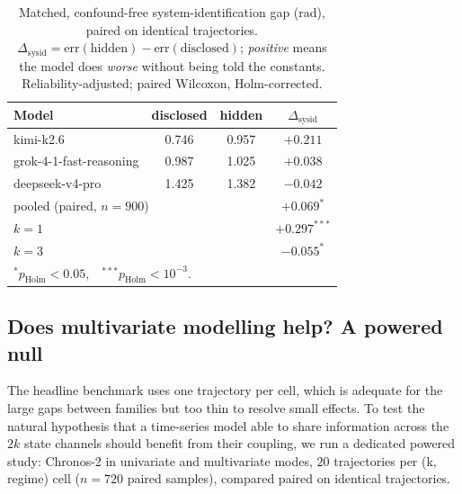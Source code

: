 \documentclass{article}
\begin{document}
\begin{table}[t]
\centering\small
\caption{Matched, confound-free system-identification gap (rad), paired on identical
trajectories. $\Delta_{\mathrm{sysid}}=\mathrm{err}(\text{hidden})-
\mathrm{err}(\text{disclosed})$; \emph{positive} means the model does \emph{worse}
without being told the constants. Reliability-adjusted; paired Wilcoxon, Holm-corrected.}
\label{tab:sysid}
\begin{tabular}{lccc}
\toprule
Model & disclosed & hidden & $\Delta_{\mathrm{sysid}}$ \\
\midrule
kimi-k2.6 & 0.746 & 0.957 & $+0.211$ \\
grok-4-1-fast-reasoning & 0.987 & 1.025 & $+0.038$ \\
deepseek-v4-pro & 1.425 & 1.382 & $-0.042$ \\
\midrule
\multicolumn{3}{l}{pooled (paired, $n{=}900$)} & $+0.069^{*}$ \\
\multicolumn{3}{l}{\quad $k{=}1$} & $+0.297^{***}$ \\
\multicolumn{3}{l}{\quad $k{=}3$} & $-0.055^{*}$ \\
\bottomrule
\multicolumn{4}{l}{\footnotesize $^{*}p_{\mathrm{Holm}}{<}0.05$,\ \ $^{***}p_{\mathrm{Holm}}{<}10^{-3}$.}
\end{tabular}
\end{table}

\subsection{Does multivariate modelling help? A powered null}
\label{sec:multivariate}
The headline benchmark uses one trajectory per cell, which is adequate for the large
gaps between families but too thin to resolve small effects. To test the natural
hypothesis that a time-series model able to share information across the $2k$ state
channels should benefit from their coupling, we run a dedicated powered study:
Chronos-2 in univariate and multivariate modes, $20$ trajectories per (k, regime)
cell ($n{=}720$ paired samples), compared paired on identical trajectories.
\end{document}
